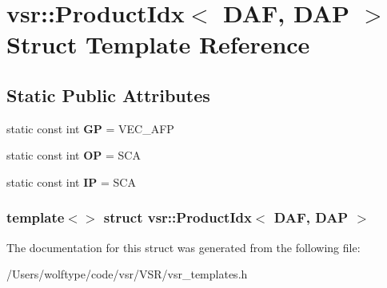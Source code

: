 \hypertarget{structvsr_1_1_product_idx_3_01_d_a_f_00_01_d_a_p_01_4}{\section{vsr\-:\-:Product\-Idx$<$ D\-A\-F, D\-A\-P $>$ Struct Template Reference}
\label{structvsr_1_1_product_idx_3_01_d_a_f_00_01_d_a_p_01_4}
}
\subsection*{Static Public Attributes}
\begin{DoxyCompactItemize}
\item 
\hypertarget{structvsr_1_1_product_idx_3_01_d_a_f_00_01_d_a_p_01_4_a01b18acfe1a045e113790405cbc0f639}{static const int {\bfseries G\-P} = V\-E\-C\-\_\-\-A\-F\-P}\label{structvsr_1_1_product_idx_3_01_d_a_f_00_01_d_a_p_01_4_a01b18acfe1a045e113790405cbc0f639}

\item 
\hypertarget{structvsr_1_1_product_idx_3_01_d_a_f_00_01_d_a_p_01_4_a3e563d98a438c427aadeb630d5ec1b07}{static const int {\bfseries O\-P} = S\-C\-A}\label{structvsr_1_1_product_idx_3_01_d_a_f_00_01_d_a_p_01_4_a3e563d98a438c427aadeb630d5ec1b07}

\item 
\hypertarget{structvsr_1_1_product_idx_3_01_d_a_f_00_01_d_a_p_01_4_a66c12d0fc6bf7386e645e4be8a9c3246}{static const int {\bfseries I\-P} = S\-C\-A}\label{structvsr_1_1_product_idx_3_01_d_a_f_00_01_d_a_p_01_4_a66c12d0fc6bf7386e645e4be8a9c3246}

\end{DoxyCompactItemize}
\subsubsection*{template$<$$>$ struct vsr\-::\-Product\-Idx$<$ D\-A\-F, D\-A\-P $>$}



The documentation for this struct was generated from the following file\-:\begin{DoxyCompactItemize}
\item 
/\-Users/wolftype/code/vsr/\-V\-S\-R/vsr\-\_\-templates.\-h\end{DoxyCompactItemize}
